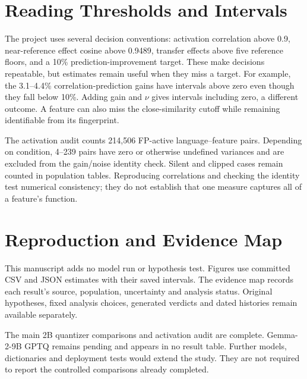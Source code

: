 \documentclass[11pt]{article}
\begin{document}
\section{Reading Thresholds and Intervals}
The project uses several decision conventions: activation correlation above 0.9, near-reference effect cosine above 0.9489, transfer effects above five reference floors, and a 10\% prediction-improvement target. These make decisions repeatable, but estimates remain useful when they miss a target. For example, the 3.1--4.4\% correlation-prediction gains have intervals above zero even though they fall below 10\%. Adding gain and $\nu$ gives intervals including zero, a different outcome. A feature can also miss the close-similarity cutoff while remaining identifiable from its fingerprint.

The activation audit counts 214,506 FP-active language--feature pairs. Depending on condition, 4--239 pairs have zero or otherwise undefined variances and are excluded from the gain/noise identity check. Silent and clipped cases remain counted in population tables. Reproducing correlations and checking the identity test numerical consistency; they do not establish that one measure captures all of a feature's function.

\section{Reproduction and Evidence Map}
This manuscript adds no model run or hypothesis test. Figures use committed CSV and JSON estimates with their saved intervals. The evidence map records each result's source, population, uncertainty and analysis status. Original hypotheses, fixed analysis choices, generated verdicts and dated histories remain available separately.

The main 2B quantizer comparisons and activation audit are complete. Gemma-2-9B GPTQ remains pending and appears in no result table. Further models, dictionaries and deployment tests would extend the study. They are not required to report the controlled comparisons already completed.
\end{document}
